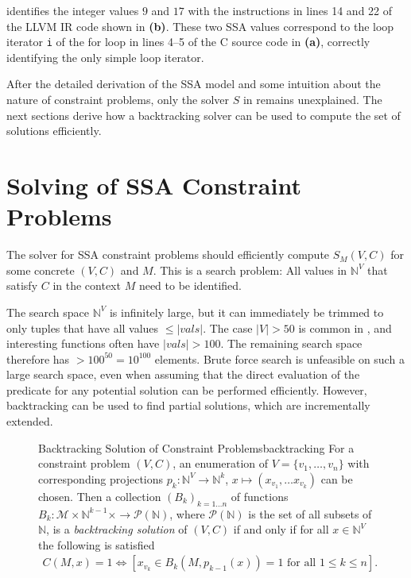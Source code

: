      identifies the integer values $9$ and $17$ with the
    instructions in lines 14 and 22 of the LLVM IR code shown in
     {\bf(b)}.
    These two SSA values correspond to the loop iterator \texttt{i} of the for
    loop in lines 4--5 of the C source code in  {\bf(a)},
    correctly identifying the only simple loop iterator.

    After the detailed derivation of the SSA model and some intuition about the
    nature of constraint problems, only the solver $S$ in
     remains unexplained.
    The next sections derive how a backtracking solver can be used to
    compute the set of solutions efficiently.

\section{Solving of SSA Constraint Problems}
\label{sec:constraintsolving}

    The solver for SSA constraint problems should efficiently compute $S_M(V,C)$
    for some concrete $(V,C)$ and $M$.
    This is a search problem:
    All values in $\mathbb N^V$ that satisfy $C$ in the context $M$ need to be
    identified.

    The search space $\mathbb N^V$ is infinitely large, but it can immediately
    be trimmed to only tuples that have all values $\leq|vals|$.
    The case \mbox{$|V|>50$} is common in
    , and interesting
    functions often have \mbox{$|vals|>100$}.
    The remaining search space therefore has $>100^{50}=10^{100}$ elements.
    Brute force search is unfeasible on such a large search space, even when assuming
    that the direct evaluation of the predicate for any potential solution can
    be performed efficiently.
    However, backtracking can be used to find partial solutions, which are
    incrementally extended.

\begin{figure}[h]
    \begin{definition}{Backtracking Solution of Constraint Problems}{backtracking}
        For a constraint problem $(V,C)$, an enumeration of
        $V=\{v_1,\dots,v_n\}$ with corresponding projections
        $p_k\colon\mathbb N^V\rightarrow\mathbb N^k$,
        $x\mapsto(x_{v_1},\dots x_{v_k})$ can be chosen.
        Then a collection $(B_k)_{k=1\dots n}$ of functions
        $B_k:\mathcal M\times \mathbb N^{k-1}\times\rightarrow\mathcal P(\mathbb N)$,
        where $\mathcal P(\mathbb N)$ is the set of all subsets of $\mathbb N$,
        is a {\em backtracking solution} of $(V,C)$ if and only if for all
        $x\in\mathbb N^V$ the following is satisfied
        \begin{align}
            C(M,x)=1\iff\left[x_{v_k}\in B_k(M,p_{k-1}(x))=1\text{ for all }1\leq k\leq n\right].
        \end{align}
    \end{definition}
\end{figure}

